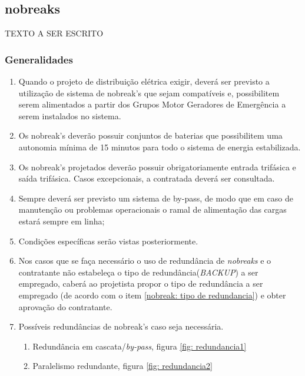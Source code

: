\subsection{nobreaks} \label{section: nobreak}
TEXTO A SER ESCRITO

\subsubsection{Generalidades}
\begin{enumerate}
	\item Quando o projeto de distribuição elétrica exigir, deverá ser previsto a utilização de sistema de nobreak’s que sejam compatíveis e, possibilitem serem alimentados a partir dos Grupos Motor Geradores de Emergência a serem instalados no sistema. 
	
	\item Os nobreak’s deverão possuir conjuntos de baterias que possibilitem uma autonomia mínima de 15 minutos para todo o sistema de energia estabilizada.
	
	\item Os nobreak’s projetados deverão possuir obrigatoriamente entrada trifásica e saída trifásica. Casos excepcionais, a contratada deverá ser consultada.
	
	\item Sempre deverá ser previsto um sistema de by-pass, de modo que em caso de manutenção ou problemas operacionais o ramal de alimentação das cargas estará sempre em linha;
	
	\item Condições específicas serão vistas posteriormente.
	
	\item Nos casos que se faça necessário o uso de redundância de \textit{nobreaks} e o contratante não estabeleça o tipo de redundância(\textit{BACKUP}) a ser empregado, caberá ao projetista propor o tipo de redundância a ser empregado (de acordo com o item \ref{nobreak: tipo de redundancia}) e obter aprovação do contratante.
	
	\item Possíveis redundâncias de nobreak's caso seja necessária.
	\begin{enumerate}\label{nobreak: tipo de redundancia}
		\item Redundância em cascata/\textit{by-pass}, figura \ref{fig: redundancia1}
		
		\item Paralelismo redundante, figura  \ref{fig: redundancia2}
		

\end{enumerate}
\end{enumerate}
